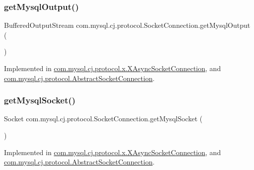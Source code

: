 \subsubsection{\texorpdfstring{get\+Mysql\+Output()}{getMysqlOutput()}}
{\footnotesize\ttfamily Buffered\+Output\+Stream com.\+mysql.\+cj.\+protocol.\+Socket\+Connection.\+get\+Mysql\+Output (\begin{DoxyParamCaption}{ }\end{DoxyParamCaption})}



Implemented in \mbox{\hyperlink{classcom_1_1mysql_1_1cj_1_1protocol_1_1x_1_1_x_async_socket_connection_a233c917f720ee49857c160155fbd75dc}{com.\+mysql.\+cj.\+protocol.\+x.\+X\+Async\+Socket\+Connection}}, and \mbox{\hyperlink{classcom_1_1mysql_1_1cj_1_1protocol_1_1_abstract_socket_connection_a7ca82cf4b1a73e5fa06fcaa01ab8a887}{com.\+mysql.\+cj.\+protocol.\+Abstract\+Socket\+Connection}}.

\mbox{\label{interfacecom_1_1mysql_1_1cj_1_1protocol_1_1_socket_connection_a121c70b73c6aed15d44533af8194ba8c}} 
\subsubsection{\texorpdfstring{get\+Mysql\+Socket()}{getMysqlSocket()}}
{\footnotesize\ttfamily Socket com.\+mysql.\+cj.\+protocol.\+Socket\+Connection.\+get\+Mysql\+Socket (\begin{DoxyParamCaption}{ }\end{DoxyParamCaption})}



Implemented in \mbox{\hyperlink{classcom_1_1mysql_1_1cj_1_1protocol_1_1x_1_1_x_async_socket_connection_a3d6ea580f0252b26d6385e69fe71f02c}{com.\+mysql.\+cj.\+protocol.\+x.\+X\+Async\+Socket\+Connection}}, and \mbox{\hyperlink{classcom_1_1mysql_1_1cj_1_1protocol_1_1_abstract_socket_connection_a0600ad7876a12ee7a8c8122c4b277e91}{com.\+mysql.\+cj.\+protocol.\+Abstract\+Socket\+Connection}}.

\mbox{\label{interfacecom_1_1mysql_1_1cj_1_1protocol_1_1_socket_connection_aaf05ea68f2fb6c8c192ee8ec8f8faf91}} 
